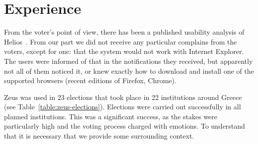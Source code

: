 \documentclass[letterpaper,10pt]{article}
\begin{document}






\section{Experience}

From the voter's point of view, there has been a published usability
analysis of Helios~\cite{karayumak:2011}. From our part we did not
receive any particular complains from the voters, except for one: that
the system would not work with Internet Explorer. The users were
informed of that in the notifications they received, but apparently
not all of them noticed it, or knew exactly how to download and
install one of the supported browsers (recent editions of Firefox,
Chrome).

Zeus was used in 23 elections that took place in 22 institutions
around Greece (see Table~\ref{table:zeus-elections}). Elections were
carried out successfully in all planned institutions. This was a
significant success, as the stakes were particularly high and the
voting process charged with emotions. To understand that it is
necessary that we provide some surrounding context.
\end{document}

